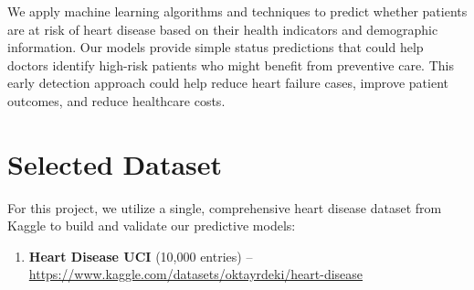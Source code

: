 \documentclass[11pt,a4paper]{article}
\begin{document}
We apply machine learning algorithms and techniques to predict whether
patients are at risk of heart disease
based on their health indicators and demographic information.
Our models provide simple status predictions that could help doctors
identify high-risk patients who might benefit from preventive care.
This early detection approach could help reduce heart failure cases,
improve patient outcomes, and reduce healthcare costs.


\section{Selected Dataset}

\begin{tcolorbox}[notebox={Dataset Information}]
    For this project, we utilize a single, comprehensive heart disease dataset from Kaggle to build and validate our predictive models:
    \vspace{-0.25cm}
    \begin{enumerate}[leftmargin=*, itemsep=2pt, parsep=0pt]
        \item \textbf{Heart Disease UCI} (10,000 entries) –
              \url{https://www.kaggle.com/datasets/oktayrdeki/heart-disease}
    \end{enumerate}
\end{tcolorbox}
\end{document}
